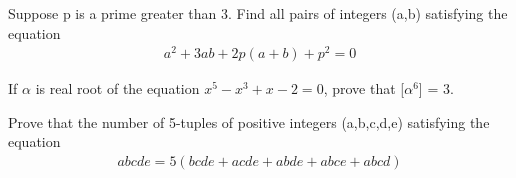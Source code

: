 \item Suppose p is a prime greater than 3. Find all pairs of integers (a,b) satisfying the equation
\begin{align*} 
a^{2} + 3ab + 2p(a + b) + p^{2} = 0
\end{align*}

\item If $\alpha$ is real root of the equation $x^{5} - x^{3} + x - 2 = 0$, prove that [$\alpha^{6}$] = 3.

\item Prove that the number of 5-tuples of positive integers (a,b,c,d,e) satisfying the equation
\begin{align*} 
abcde = 5(bcde + acde + abde + abce + abcd)
\end{align*}



















